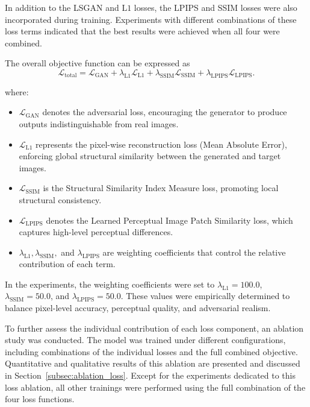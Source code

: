 In addition to the LSGAN and $\mathrm{L1}$ losses, the LPIPS and SSIM losses were also incorporated during training. Experiments with different combinations of these loss terms indicated that the best results were achieved when all four were combined. 

The overall objective function can be expressed as
\begin{equation}
\mathcal{L}_{\text{total}} =
\mathcal{L}_{\text{GAN}} +
\lambda_{\text{L1}} \mathcal{L}_{\text{L1}} +
\lambda_{\text{SSIM}} \mathcal{L}_{\text{SSIM}} +
\lambda_{\text{LPIPS}} \mathcal{L}_{\text{LPIPS}}.
\end{equation}

where:
\begin{itemize}
    \item $\mathcal{L}_{\text{GAN}}$ denotes the adversarial loss, encouraging the generator to produce outputs indistinguishable from real images.
    \item $\mathcal{L}_{\text{L1}}$ represents the pixel-wise reconstruction loss (Mean Absolute Error), enforcing global structural similarity between the generated and target images.
    \item $\mathcal{L}_{\text{SSIM}}$ is the Structural Similarity Index Measure loss, promoting local structural consistency.
    \item $\mathcal{L}_{\text{LPIPS}}$ denotes the Learned Perceptual Image Patch Similarity loss, which captures high-level perceptual differences.
    \item $\lambda_{\text{L1}}, \lambda_{\text{SSIM}},$ and $\lambda_{\text{LPIPS}}$ are weighting coefficients that control the relative contribution of each term.
\end{itemize}

In the experiments, the weighting coefficients were set to
$\lambda_{\text{L1}} = 100.0$, 
$\lambda_{\text{SSIM}} = 50.0$, and 
$\lambda_{\text{LPIPS}} = 50.0$.
These values were empirically determined to balance pixel-level accuracy, perceptual quality, and adversarial realism. 

To further assess the individual contribution of each loss component, an ablation study was conducted. The model was trained under different configurations, including combinations of the individual losses and the full combined objective. Quantitative and qualitative results of this ablation are presented and discussed in Section~\ref{subsec:ablation_loss}. Except for the experiments dedicated to this loss ablation, all other trainings were performed using the full combination of the four loss functions.

